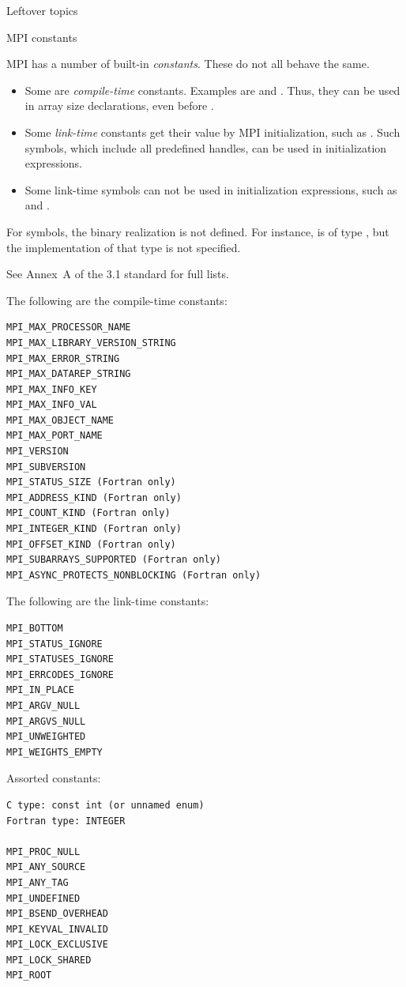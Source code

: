  {Leftover topics}

 {MPI constants}

MPI has a number of built-in \emph{constants}. These do not all behave
the same.
\begin{itemize}
\item Some are \emph{compile-time}
  constants. Examples are  and
  . Thus, they can be used in
  array size declarations, even before .
\item Some \emph{link-time}
  constants get their value by MPI initialization, such as
  . Such symbols, which include all
  predefined handles, can be used in initialization expressions.
\item Some link-time symbols can not be used in initialization
  expressions, such as  and .
\end{itemize}

For symbols, the binary realization is not defined. For instance,
 is of type , but
the implementation of that type is not specified.

See Annex~A of the 3.1 standard for full lists.

The following are the compile-time constants:
\begin{verbatim}
MPI_MAX_PROCESSOR_NAME
MPI_MAX_LIBRARY_VERSION_STRING
MPI_MAX_ERROR_STRING
MPI_MAX_DATAREP_STRING
MPI_MAX_INFO_KEY
MPI_MAX_INFO_VAL
MPI_MAX_OBJECT_NAME
MPI_MAX_PORT_NAME
MPI_VERSION
MPI_SUBVERSION
MPI_STATUS_SIZE (Fortran only)
MPI_ADDRESS_KIND (Fortran only)
MPI_COUNT_KIND (Fortran only)
MPI_INTEGER_KIND (Fortran only)
MPI_OFFSET_KIND (Fortran only)
MPI_SUBARRAYS_SUPPORTED (Fortran only)
MPI_ASYNC_PROTECTS_NONBLOCKING (Fortran only)
\end{verbatim}

The following are the link-time constants:
\begin{verbatim}
MPI_BOTTOM
MPI_STATUS_IGNORE
MPI_STATUSES_IGNORE
MPI_ERRCODES_IGNORE
MPI_IN_PLACE
MPI_ARGV_NULL
MPI_ARGVS_NULL
MPI_UNWEIGHTED
MPI_WEIGHTS_EMPTY
\end{verbatim}

Assorted constants:
\begin{verbatim}
C type: const int (or unnamed enum)
Fortran type: INTEGER

MPI_PROC_NULL
MPI_ANY_SOURCE
MPI_ANY_TAG
MPI_UNDEFINED
MPI_BSEND_OVERHEAD
MPI_KEYVAL_INVALID                
MPI_LOCK_EXCLUSIVE
MPI_LOCK_SHARED
MPI_ROOT
\end{verbatim}

